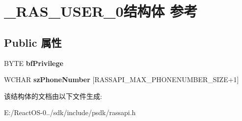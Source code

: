 \hypertarget{struct___r_a_s___u_s_e_r__0}{}\section{\+\_\+\+R\+A\+S\+\_\+\+U\+S\+E\+R\+\_\+0结构体 参考}
\label{struct___r_a_s___u_s_e_r__0}
\subsection*{Public 属性}
\begin{DoxyCompactItemize}
\item 
\mbox{\label{struct___r_a_s___u_s_e_r__0_abb625bbb00edf8edcad674f0db5fe6b4}} 
B\+Y\+TE {\bfseries bf\+Privilege}
\item 
\mbox{\label{struct___r_a_s___u_s_e_r__0_a61c17016bb1f732997c52bee8a090525}} 
W\+C\+H\+AR {\bfseries sz\+Phone\+Number} \mbox{[}R\+A\+S\+S\+A\+P\+I\+\_\+\+M\+A\+X\+\_\+\+P\+H\+O\+N\+E\+N\+U\+M\+B\+E\+R\+\_\+\+S\+I\+ZE+1\mbox{]}
\end{DoxyCompactItemize}


该结构体的文档由以下文件生成\+:\begin{DoxyCompactItemize}
\item 
E\+:/\+React\+O\+S-\/0../sdk/include/psdk/rassapi.\+h\end{DoxyCompactItemize}
